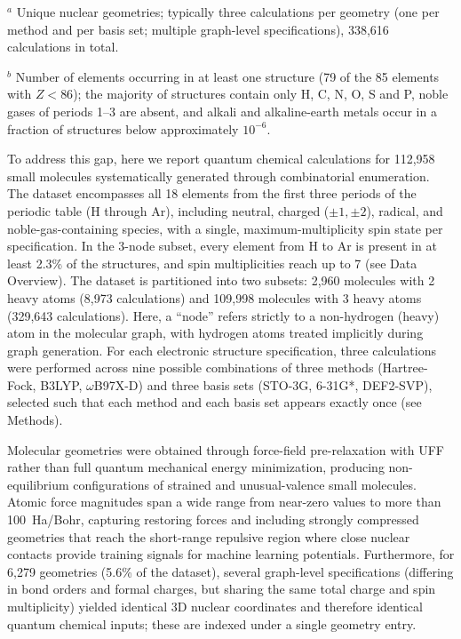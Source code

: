 \documentclass[fleqn,10pt]{article}
\begin{document}
\begin{table}[ht!]
\par
\begin{minipage}{\linewidth}
\footnotesize\justifying
$^{a}$ Unique nuclear geometries; typically three calculations per geometry (one per method and per basis set; multiple graph-level specifications), 338,616 calculations in total.

$^{b}$ Number of elements occurring in at least one structure (79 of the 85 elements with $Z<86$); the majority of structures contain only H, C, N, O, S and P, noble gases of periods 1--3 are absent, and alkali and alkaline-earth metals occur in a fraction of structures below approximately $10^{-6}$.
\end{minipage}
\caption{Comparison of the present dataset with representative quantum chemistry datasets used in machine learning.}
\label{tab:comparison}
\end{table}

To address this gap, here we report quantum chemical calculations for 112,958 small molecules systematically generated through combinatorial enumeration. The dataset encompasses all 18 elements from the first three periods of the periodic table (H through Ar), including neutral, charged ($\pm 1, \pm 2$), radical, and noble-gas-containing species, with a single, maximum-multiplicity spin state per specification. In the 3-node subset, every element from H to Ar is present in at least 2.3\% of the structures, and spin multiplicities reach up to 7 (see Data Overview). The dataset is partitioned into two subsets: 2,960 molecules with 2 heavy atoms (8,973 calculations) and 109,998 molecules with 3 heavy atoms (329,643 calculations). Here, a ``node'' refers strictly to a non-hydrogen (heavy) atom in the molecular graph, with hydrogen atoms treated implicitly during graph generation. For each electronic structure specification, three calculations were performed across nine possible combinations of three methods (Hartree-Fock, B3LYP, $\omega$B97X-D) and three basis sets (STO-3G, 6-31G*, DEF2-SVP), selected such that each method and each basis set appears exactly once (see Methods).

Molecular geometries were obtained through force-field pre-relaxation with UFF rather than full quantum mechanical energy minimization, producing non-equilibrium configurations of strained and unusual-valence small molecules. Atomic force magnitudes span a wide range from near-zero values to more than 100~Ha/Bohr, capturing restoring forces and including strongly compressed geometries that reach the short-range repulsive region where close nuclear contacts provide training signals for machine learning potentials. Furthermore, for 6,279 geometries (5.6\% of the dataset), several graph-level specifications (differing in bond orders and formal charges, but sharing the same total charge and spin multiplicity) yielded identical 3D nuclear coordinates and therefore identical quantum chemical inputs; these are indexed under a single geometry entry.
\end{document}
